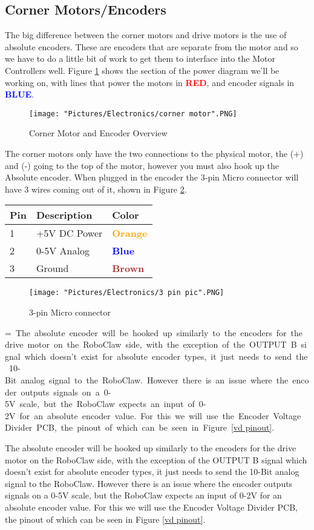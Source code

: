 \documentclass[12pt]{article}
\makeatletter
\newcommand{\mybox}[1]{%
  \setbox0=\hbox{#1}%
  \setlength{\@tempdima}{\dimexpr\wd0+13pt}%
  \begin{tcolorbox}[colframe=mycolor,boxrule=0.5pt,arc=4pt,
      left=6pt,right=6pt,top=6pt,bottom=6pt,boxsep=0pt,width=0.95\textwidth]
    #1
  \end{tcolorbox}
}
\makeatother
\begin{document}
\subsection{Corner Motors/Encoders}
The big difference between the corner motors and drive motors is the use of absolute encoders. These are encoders that are separate from the motor and so we have to do a little bit of work to get them to interface into the Motor Controllers well. Figure \ref{corner motors over} shows the section of the power diagram we'll be working on, with lines that power the motors in \textcolor{red}{\textbf{RED}}, and encoder signals in \textcolor{blue}{\textbf{BLUE}}.


\begin{figure}[H]
  	\centering
    	\texttt{[image: "Pictures/Electronics/corner motor".PNG]}
 	\caption{Corner Motor and Encoder Overview}
	\label{corner motors over}
\end{figure}

 The corner motors only have the two connections to the physical motor, the (+) and (-) going to the top of the motor, however you must also hook up the Absolute encoder. When plugged in the encoder the 3-pin Micro connector will have 3 wires coming out of it, shown in Figure \ref{3pin}.

\bigskip
\begin{tabular}[3] {| p{3cm} | p{7cm} | p{3cm} | }
	\hline
	\textbf{Pin} & \textbf{Description} & \textbf{Color} \\ \hline
	1 & +5V DC Power & \textcolor{orange}{\textbf{Orange}} \\ \hline
	2 & 0-5V Analog & \textcolor{blue}{\textbf{Blue}} \\ \hline
	3 & Ground & \textcolor{brown}{\textbf{Brown}} \\ \hline
\end{tabular}

\bigskip 

\begin{figure}[H]
 	\centering
	\texttt{[image: "Pictures/Electronics/3 pin pic".PNG]}
 	\caption{3-pin Micro connector}
	\label{3pin}
\end{figure}

\mybox{
The absolute encoder will be hooked up similarly to the encoders for the drive motor on the RoboClaw side, with the exception of the OUTPUT B signal which doesn't exist for absolute encoder types, it just needs to send the 10-Bit analog signal to the RoboClaw. However there is an issue where the encoder outputs signals on a 0-5V scale, but the RoboClaw expects an input of 0-2V for an absolute encoder value. For this we will use the Encoder Voltage Divider PCB, the pinout of which can be seen in Figure \ref{vd pinout}. 
}
\end{document}

